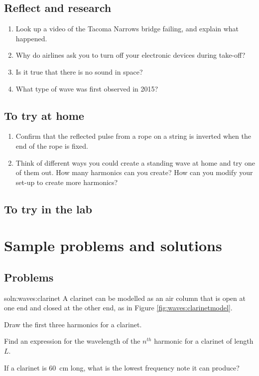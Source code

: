 \subsection{Reflect and research}

\begin{enumerate}
\item Look up a video of the Tacoma Narrows bridge failing, and explain what happened.
\item Why do airlines ask you to turn off your electronic devices during take-off?
\item Is it true that there is no sound in space?
\item What type of wave was first observed in 2015?
\end{enumerate}
\subsection{To try at home}
\begin{enumerate}
\item Confirm that the reflected pulse from a rope on a string is inverted when the end of the rope is fixed.
\item Think of different ways you could create a standing wave at home and try one of them out. How many harmonics can you create? How can you modify your set-up to create more harmonics?
\end{enumerate}
\subsection{To try in the lab}

\newpage
\section{Sample problems and solutions}
\subsection{Problems}

\begin{problemParts}{soln:waves:clarinet}{\label{prob:waves:clarinet} A clarinet can be modelled as an air column that is open at one end and closed at the other end, as in Figure \ref{fig:waves:clarinetmodel}.
}
\item Draw the first three harmonics for a clarinet.
\item Find an expression for the wavelength of the $n^{th}$ harmonic for a clarinet of length $L$.
\item If a clarinet is \SI{60}{cm} long, what is the lowest frequency note it can produce?
\end{problemParts}

